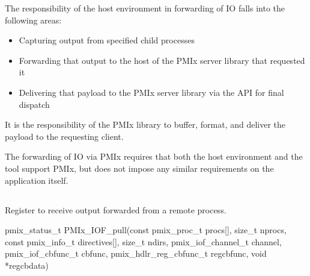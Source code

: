 \advicermstart
The responsibility of the host environment in forwarding of \ac{IO} falls into the following areas:

\begin{itemize}
    \item Capturing output from specified child processes
    \item Forwarding that output to the host of the \ac{PMIx} server library that requested it
    \item Delivering that payload to the \ac{PMIx} server library via the  \ac{API} for final dispatch
\end{itemize}

It is the responsibility of the \ac{PMIx} library to buffer, format, and deliver the payload to the requesting client.
\advicermend

\adviceuserstart
The forwarding of \ac{IO} via \ac{PMIx} requires that both the host environment and the tool support \ac{PMIx}, but does not impose any similar requirements on the application itself.
\adviceuserend


\subsection{}

\summary

Register to receive output forwarded from a remote process.

\format

\cspecificstart
\begin{codepar}
pmix_status_t
PMIx_IOF_pull(const pmix_proc_t procs[], size_t nprocs,
              const pmix_info_t directives[], size_t ndirs,
              pmix_iof_channel_t channel, pmix_iof_cbfunc_t cbfunc,
              pmix_hdlr_reg_cbfunc_t regcbfunc, void *regcbdata)
\end{codepar}
\cspecificend

\begin{arglist}
\end{arglist}

